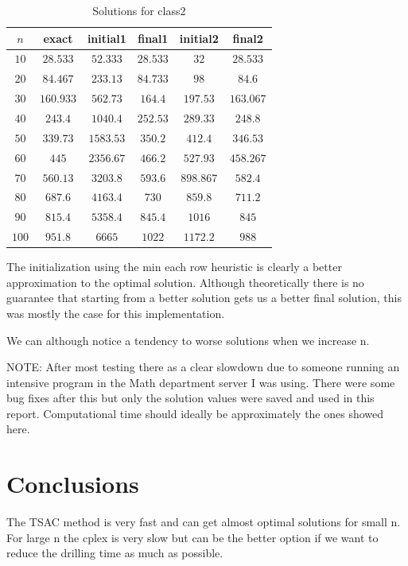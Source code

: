 \documentclass[a4paper, 11pt]{article}
\begin{document}
	\begin{table}[H]
		\centering
		\begin{tabular}{c|c|c|c|c|c}
			\textbf{$ n $} 	& \textbf{exact} & \textbf{initial1}   & \textbf{final1}& \textbf{initial2} & \textbf{final2} 	\\ \hline
			$ 10  $			& $ 28.533 $ 	& $ 52.333 $ 			& $ 28.533 $  	& $ 32 $ 			& $ 28.533 $		\\ \hline
			$ 20  $			& $ 84.467 $ 	& $ 233.13 $ 			& $ 84.733 $  	& $ 98 $ 			& $ 84.6$		\\ \hline
			$ 30  $			& $ 160.933 $ 	& $ 562.73 $ 			& $ 164.4 $  	& $ 197.53 $ 		& $ 163.067 $ \\ \hline
			$ 40  $			& $ 243.4 $ 	& $ 1040.4 $ 			& $ 252.53 $  	& $ 289.33 $ 		& $ 248.8 $ \\ \hline
			$ 50  $			& $ 339.73 $ 	& $ 1583.53 $ 			& $ 350.2 $  	& $ 412.4 $ 		& $ 346.53 $ \\ \hline
			$ 60  $			& $ 445 $ 		& $ 2356.67 $ 			& $ 466.2 $  	& $ 527.93 $ 		& $ 458.267 $ \\ \hline
			$ 70 $			& $ 560.13 $ 	& $ 3203.8 $ 			& $ 593.6 $  	& $ 898.867 $ 		& $ 582.4 $ \\ \hline
			$ 80 $			& $ 687.6 $ 	& $ 4163.4 $ 			& $ 730 $  		& $ 859.8 $ 		& $ 711.2 $ \\ \hline
			$ 90 $			& $ 815.4 $ 	& $ 5358.4 $ 			& $ 845.4 $  	& $ 1016 $ 			& $ 845 $ \\ \hline
			$ 100 $			& $ 951.8 $ 	& $ 6665 $ 				& $ 1022 $  	& $ 1172.2 $ 		& $ 988$ \\
		\end{tabular}
		\caption{Solutions for class2}
		\label{table:sols2}
	\end{table}

	The initialization using the min each row heuristic is clearly a better approximation to the optimal solution.
	Although theoretically there is no guarantee that starting from a better solution gets us a better final solution, this was mostly the case for this implementation.
	
	We can although notice a tendency to worse solutions when we increase n.
	
	
	
	
	
	NOTE: After most testing there as a clear slowdown due to someone running an intensive program in the Math department server I was using.
	There were some bug fixes after this but only the solution values were saved and used in this report. 
	Computational time should ideally be approximately the ones showed here.
	
	\section{Conclusions}
	
		The TSAC method is very fast and can get almost optimal solutions for small n.
		For large n the cplex is very slow but can be the better option if we want to reduce the drilling time as much as possible.
	
	
\end{document}
